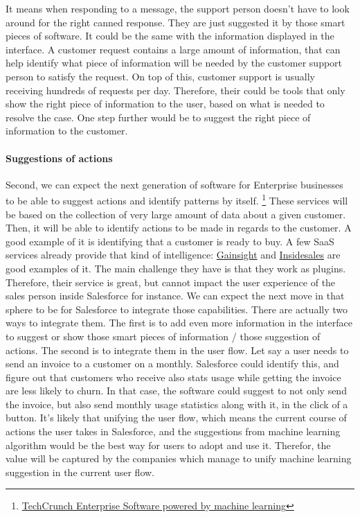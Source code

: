 \documentclass[12pt]{article}
\begin{document}
\smallskip

It means when responding to a message, the support person doesn't have to look
around for the right canned response. They are just suggested it by those smart
pieces of software. It could be the same with the information displayed in the
interface. A customer request contains a large amount of information, that can
help identify what piece of information will be needed by the customer support
person to satisfy the request. On top of this, customer support is usually
receiving hundreds of requests per day. Therefore, their could be tools that
only show the right piece of information to the user, based on what is needed to
resolve the case. One step further would be to suggest the right piece of
information to the customer.

\paragraph{Suggestions of actions}

Second, we can expect the next generation of software for Enterprise businesses
to be able to suggest actions and identify patterns by itself.
\footnote{\href{http://techcrunch.com/2015/07/27/the-next-wave-of-enterprise-software-powered-by-machine-learning}
{TechCrunch Enterprise Software powered by machine learning}}
These services will be based on the collection of very large amount of data about
a given customer. Then, it will be able to identify actions to be made in regards
to the customer. A good example of it is identifying that a customer is ready to
buy. A few SaaS services already provide that kind of intelligence:
\href{http://www.gainsight.com/}{Gainsight} and
\href{http://uk.insidesales.com/}{Insidesales} are good examples of it.
The main challenge they have is that they work as plugins. Therefore, their
service is great, but cannot impact the user experience of the sales person
inside Salesforce for instance.
We can expect the next move in that sphere to be for Salesforce to integrate
those capabilities. There are actually two ways to integrate them. The first
is to add even more information in the interface to suggest or show those smart
pieces of information / those suggestion of actions. The second is to integrate
them in the user flow. Let say a user needs to send an invoice to a customer on
a monthly. Salesforce could identify this, and figure out that customers who
receive also stats usage while getting the invoice are less likely to churn. In
that case, the software could suggest to not only send the invoice, but also
send monthly usage statistics along with it, in the click of a button.
It's likely that unifying the user flow, which means the current course of
actions the user takes in Salesforce, and the suggestions from machine learning
algorithm would be the best way for users to adopt and use it. Therefor, the
value will be captured by the companies which manage to unify machine learning
suggestion in the current user flow.
\end{document}
